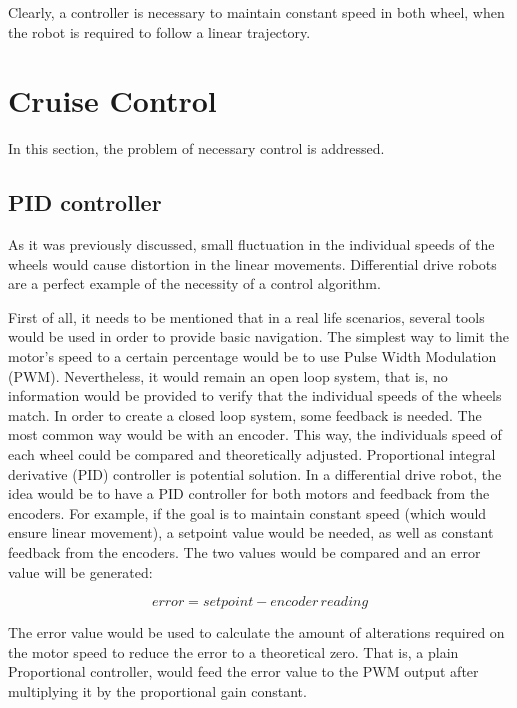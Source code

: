 Clearly, a controller is necessary to maintain constant speed in both wheel, when the robot is required to follow a linear trajectory.

\section{Cruise Control}

In this section, the problem of necessary control is addressed. 

\subsection{PID controller}

As it was previously discussed, small fluctuation in the individual speeds of the wheels would cause distortion in the linear movements. Differential drive robots are a perfect example of the necessity of a control algorithm.

First of all, it needs to be mentioned that in a real life scenarios, several tools would be used in order to provide basic navigation. The simplest way to limit the motor's speed to a certain percentage would be to use Pulse Width Modulation (PWM). Nevertheless, it would remain an open loop system, that is, no information would be provided to verify that the individual speeds of  the wheels match. In order to create a closed loop system, some feedback is needed. The most common way would be with an encoder. This way, the individuals speed of each wheel could be compared and theoretically adjusted. 
Proportional integral derivative (PID) controller is potential solution. In a differential drive robot, the idea would be to have a PID controller for both motors and feedback from the encoders. For example, if the goal is to maintain constant speed (which would ensure linear movement), a setpoint value would be needed, as well as constant feedback from the encoders. The two values would be compared and an error value will be generated:\cite{PID}

\begin{equation}
error = setpoint - encoder\,reading
\end{equation}

The error value would be used to calculate the amount of alterations required on the motor speed to reduce the error to a theoretical zero. That is, a plain Proportional controller, would feed the error value to the PWM output after multiplying it by the proportional gain constant. 

